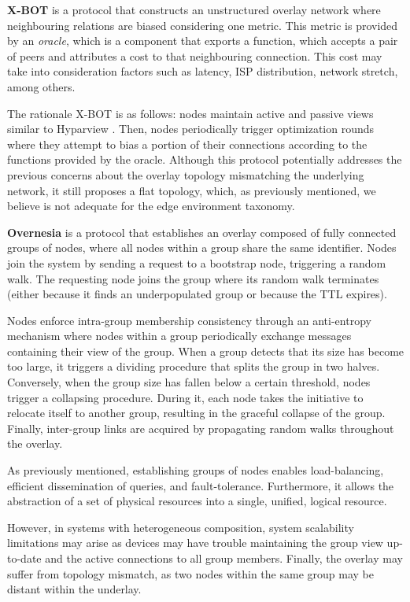 \textbf{X-BOT} \cite{x-bot} is a protocol that constructs an unstructured overlay network where neighbouring relations are biased considering one metric. This metric is provided by an \textit{oracle}, which is a component that exports a function, which accepts a pair of peers and attributes a cost to that neighbouring connection. This cost may take into consideration factors such as latency, ISP distribution, network stretch, among others. 

The rationale X-BOT is as follows: nodes maintain active and passive views similar to Hyparview \cite{Hyparview}. Then, nodes periodically trigger optimization rounds where they attempt to bias a portion of their connections according to the functions provided by the oracle. Although this protocol potentially addresses the previous concerns about the overlay topology mismatching the underlying network, it still proposes a flat topology, which, as previously mentioned, we believe is not adequate for the edge environment taxonomy. 

\textbf{Overnesia} \cite{leitao2014overnesia} is a protocol that establishes an overlay composed of fully connected groups of nodes, where all nodes within a group share the same identifier. Nodes join the system by sending a request to a bootstrap node, triggering a random walk. The requesting node joins the group where its random walk terminates (either because it finds an underpopulated group or because the TTL expires). 

Nodes enforce intra-group membership consistency through an anti-entropy mechanism where nodes within a group periodically exchange messages containing their view of the group. When a group detects that its size has become too large, it triggers a dividing procedure that splits the group in two halves. Conversely, when the group size has fallen below a certain threshold, nodes trigger a collapsing procedure. During it, each node takes the initiative to relocate itself to another group, resulting in the graceful collapse of the group. Finally, inter-group links are acquired by propagating random walks throughout the overlay.

As previously mentioned, establishing groups of nodes enables load-balancing, efficient dissemination of queries, and fault-tolerance. Furthermore, it allows the abstraction of a set of physical resources into a single, unified, logical resource. 

However, in systems with heterogeneous composition, system scalability limitations may arise as devices may have trouble maintaining the group view up-to-date and the active connections to all group members. Finally, the overlay may suffer from topology mismatch, as two nodes within the same group may be distant within the underlay.

